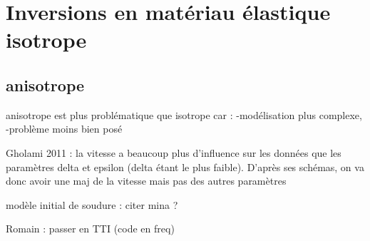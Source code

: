 \section{Inversions en matériau élastique isotrope}




\subsection{anisotrope}

anisotrope est plus problématique que isotrope car : 
-modélisation plus complexe,
-problème moins bien posé

Gholami 2011 : la vitesse a beaucoup plus d'influence sur les données que les paramètres delta et epsilon (delta étant le plus faible). D'après ses schémas, on va donc avoir une maj de la vitesse mais pas des autres paramètres

modèle initial de soudure : citer mina ?



Romain : passer en TTI (code en freq)

